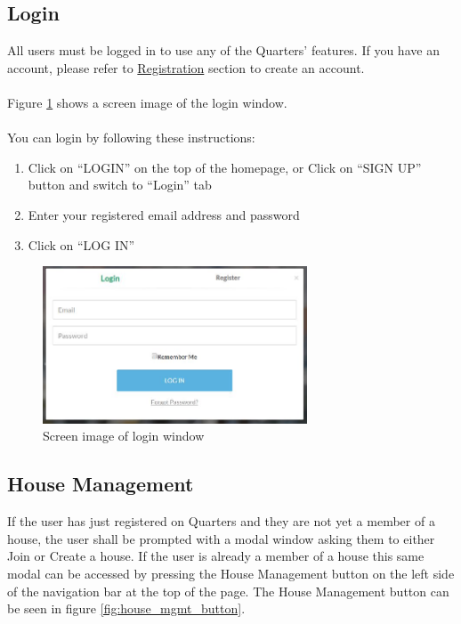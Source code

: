 \documentclass[12pt]{article}
\begin{document}
    \subsection{Login}
    All users must be logged in to use any of the Quarters' features. If you have an account, please refer to \hyperref[sec:registration]{Registration} section to create an account. \\\\
    Figure \ref{fig:login} shows a screen image of the login window.\\\\
    You can login by following these instructions:
    \begin{enumerate}
        \item Click on ``LOGIN'' on the top of the homepage, or Click on ``SIGN UP'' button and switch to ``Login'' tab
        \item Enter your registered email address and password
        \item Click on ``LOG IN''
    \end{enumerate}
    \begin{figure}
        \centering
        \includegraphics[width=0.7\textwidth]{login}
        \caption{Screen image of login window}
        \label{fig:login}
    \end{figure}
    \subsection{House Management} %
    \label{sec:housemanagement}
    If the user has just registered on Quarters and they are not yet a member of a house, the user shall be prompted with a modal window asking them to either Join or Create a house. If the user is already a member of a house this same modal can be accessed by pressing the House Management button on the  left side of the navigation bar at the top of the page. The House Management button can be seen in figure \ref{fig:house_mgmt_button}.
    
\end{document}
